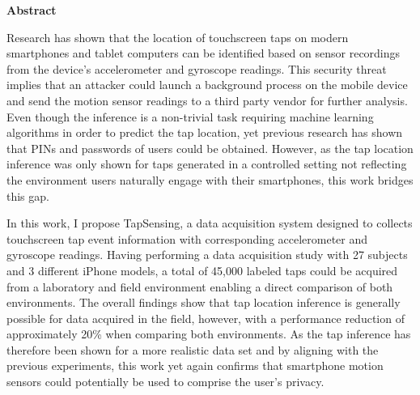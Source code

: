 \thispagestyle{empty}
\vspace*{1.0cm}

\begin{center}
    \textbf{Abstract}
\end{center}

\vspace*{0.5cm}

\noindent

Research has shown that the location of touchscreen taps on modern smartphones and tablet computers can be identified based on sensor recordings from the device's accelerometer and gyroscope readings. This security threat implies that an attacker could launch a background process on the mobile device and send the motion sensor readings to a third party vendor for further analysis. Even though the inference is a non-trivial task requiring machine learning algorithms in order to predict the tap location, yet previous research has shown that PINs and passwords of users could be obtained. However, as the tap location inference was only shown for taps generated in a controlled setting not reflecting the environment users naturally engage with their smartphones, this work bridges this gap.

In this work, I propose TapSensing, a data acquisition system designed to collects touchscreen tap event information with corresponding accelerometer and gyroscope readings. Having performing a data acquisition study with 27 subjects and 3 different iPhone models, a total of 45,000 labeled taps could be acquired from a laboratory and field environment enabling a direct comparison of both environments. The overall findings show that tap location inference is generally possible for data acquired in the field, however, with a performance reduction of approximately 20\% when comparing both environments. As the tap inference has therefore been shown for a more realistic data set and by aligning with the previous experiments, this work yet again confirms that smartphone motion sensors could potentially be used to comprise the user's privacy.